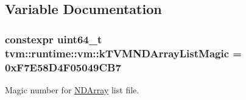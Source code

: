 \subsection{Variable Documentation}
\subsubsection[{\texorpdfstring{k\+T\+V\+M\+N\+D\+Array\+List\+Magic}{kTVMNDArrayListMagic}}]{\setlength{\rightskip}{0pt plus 5cm}constexpr uint64\+\_\+t tvm\+::runtime\+::vm\+::k\+T\+V\+M\+N\+D\+Array\+List\+Magic = 0x\+F7\+E58\+D4\+F05049\+C\+B7}\hypertarget{namespacetvm_1_1runtime_1_1vm_a29161815faff1b5a221c0dae1c87bb4e}{}\label{namespacetvm_1_1runtime_1_1vm_a29161815faff1b5a221c0dae1c87bb4e}


Magic number for \hyperlink{classtvm_1_1runtime_1_1NDArray}{N\+D\+Array} list file. 

